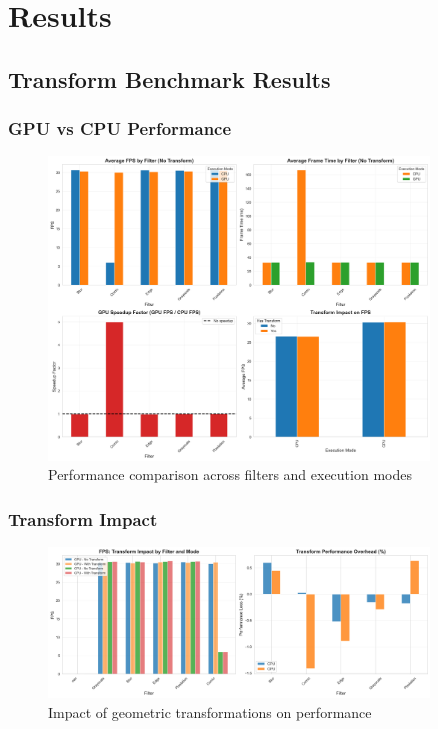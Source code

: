 \documentclass[12pt,a4paper]{article}
\begin{document}
\section{Results}

\subsection{Transform Benchmark Results}

\subsubsection{GPU vs CPU Performance}
\begin{figure}[H]
    \centering
    \includegraphics[width=0.9\textwidth]{../data/plots/performance_comparison_transforms.png}
    \caption{Performance comparison across filters and execution modes}
    \label{fig:transform_comparison}
\end{figure}


\subsubsection{Transform Impact}
\begin{figure}[H]
    \centering
    \includegraphics[width=0.9\textwidth]{../data/plots/transform_comparison.png}
    \caption{Impact of geometric transformations on performance}
    \label{fig:transform_impact}
\end{figure}
\end{document}
